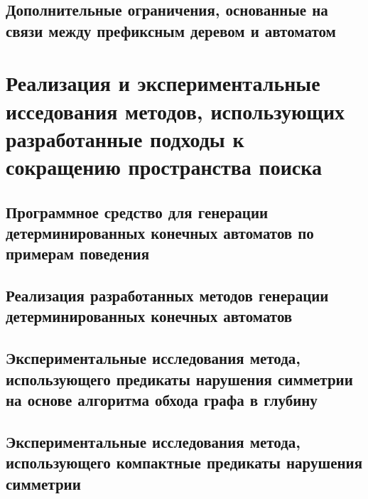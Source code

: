 \subsection{Дополнительные ограничения, основанные на связи между префиксным деревом и автоматом}
\label{sec:space:pruning:apta-exploiting}



\section{Реализация и экспериментальные исседования методов, использующих разработанные подходы к сокращению пространства поиска}
\label{sec:space:results}


\subsection{Программное средство для генерации детерминированных конечных автоматов по примерам поведения}
\label{sec:space:results:dfa-inductor-py}


\subsection{Реализация разработанных методов генерации детерминированных конечных автоматов}
\label{sec:space:results:impl}


\subsection{Экспериментальные исследования метода, использующего предикаты нарушения симметрии на основе алгоритма обхода графа в глубину}
\label{sec:space:results:dfs}


\subsection{Экспериментальные исследования метода, использующего компактные предикаты нарушения симметрии}
\label{sec:space:results:tight}


